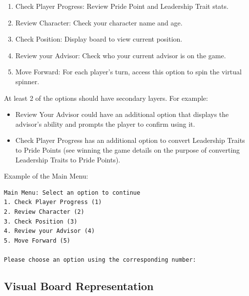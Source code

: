 \begin{enumerate}
    
\item Check Player Progress: Review Pride Point and Leadership Trait stats.
\item Review Character:  Check your character name and age. 
\item Check Position: Display board to view current position.
\item Review your Advisor: Check who your current advisor is on the game.
\item Move Forward: For each player's turn, access this option to spin the virtual spinner.
\end{enumerate}

    At least 2 of the options should have secondary layers. For example: 
        \begin{itemize}
        \item Review Your Advisor could have an additional option that displays the advisor’s ability and prompts the player to confirm using it.
        \item Check Player Progress has an additional option to convert Leadership Traits to Pride Points (see winning the game details on the purpose of converting Leadership Traits to Pride Points).
        \end{itemize}

Example of the Main Menu:
\begin{verbatim}
Main Menu: Select an option to continue 
1. Check Player Progress (1)
2. Review Character (2)
3. Check Position (3)
4. Review your Advisor (4)
5. Move Forward (5)

Please choose an option using the corresponding number: 
\end{verbatim}

\subsection{Visual Board Representation}
